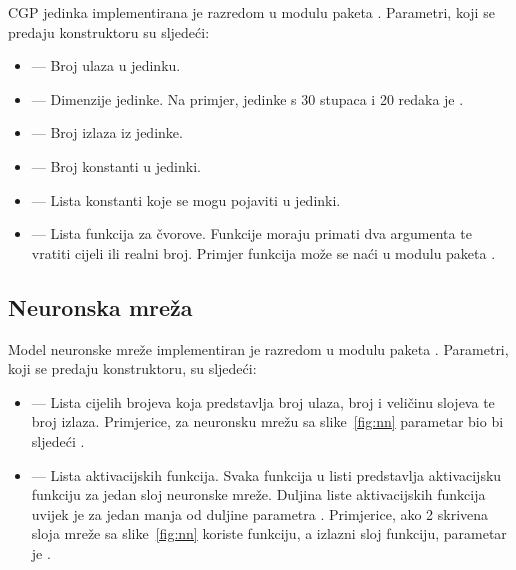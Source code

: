 \documentclass[times, utf8, zavrsni, numeric]{fer}
\begin{document}
CGP jedinka implementirana je razredom  u modulu
 paketa . Parametri, koji se predaju
konstruktoru su sljedeći:
\begin{itemize}
    \item {} --- Broj ulaza u jedinku.
    \item {} --- Dimenzije jedinke. Na primjer,
         jedinke s 30 stupaca i 20 redaka je .
    \item {} --- Broj izlaza iz jedinke.
    \item {} --- Broj konstanti u jedinki.
    \item {} --- Lista konstanti koje se mogu pojaviti u
        jedinki.
    \item {} --- Lista funkcija za čvorove. Funkcije moraju
        primati dva argumenta te vratiti cijeli ili realni broj. Primjer
        funkcija može se naći u modulu  paketa
        .
\end{itemize}


\subsection{Neuronska mreža}

Model neuronske mreže implementiran je razredom  u modulu
 paketa . Parametri, koji se predaju
konstruktoru, su sljedeći:
\begin{itemize}
    \item {} --- Lista cijelih brojeva koja predstavlja broj ulaza,
        broj i veličinu slojeva te broj izlaza. Primjerice, za neuronsku mrežu
        sa slike~\ref{fig:nn} parametar  bio bi sljedeći
        .
    \item {} --- Lista aktivacijskih funkcija. Svaka
        funkcija u listi predstavlja aktivacijsku funkciju za jedan sloj
        neuronske mreže. Duljina liste aktivacijskih funkcija uvijek je za jedan
        manja od duljine parametra . Primjerice, ako 2 skrivena
        sloja mreže sa slike~\ref{fig:nn} koriste  funkciju, a
        izlazni sloj  funkciju, parametar
         je .
\end{itemize}
\end{document}
